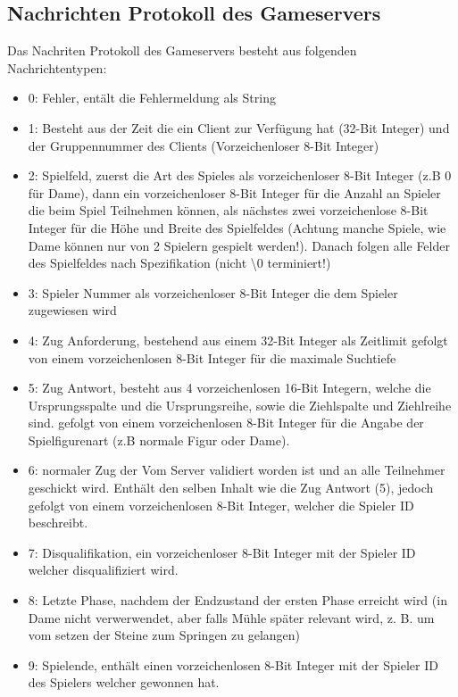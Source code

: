 \documentclass[12pt,a4paper,bibliography=totocnumbered,listof=totocnumbered]{article}
\begin{document}
\begin{appendix}
\pagebreak

\section{Nachrichten Protokoll des Gameservers}
\label{apx:Protokoll}
Das Nachriten Protokoll des Gameservers besteht aus folgenden Nachrichtentypen:
\begin{itemize}
    \item 0: Fehler, entält die Fehlermeldung als String
    \item 1: Besteht aus der Zeit die ein Client zur Verfügung hat (32-Bit Integer) und der Gruppennummer des Clients (Vorzeichenloser 8-Bit Integer)
    \item 2: Spielfeld, zuerst die Art des Spieles als vorzeichenloser 8-Bit Integer (z.B 0 für Dame), dann ein vorzeichenloser 8-Bit Integer für die Anzahl an Spieler die 
    beim Spiel Teilnehmen können, als nächstes zwei vorzeichenlose 8-Bit Integer für die Höhe und Breite des Spielfeldes 
    (Achtung manche Spiele, wie Dame können nur von 2 Spielern gespielt werden!).
    Danach folgen alle Felder des Spielfeldes nach Spezifikation (nicht \textbackslash0 terminiert!)
    \item 3: Spieler Nummer als vorzeichenloser 8-Bit Integer die dem Spieler zugewiesen wird
    \item 4: Zug Anforderung, bestehend aus einem 32-Bit Integer als Zeitlimit gefolgt von einem vorzeichenlosen 8-Bit Integer für die maximale Suchtiefe
    \item 5: Zug Antwort, besteht aus 4 vorzeichenlosen 16-Bit Integern, welche die Ursprungsspalte und die Ursprungsreihe, sowie die Ziehlspalte und Ziehlreihe sind.
    gefolgt von einem vorzeichenlosen 8-Bit Integer für die Angabe der Spielfigurenart (z.B normale Figur oder Dame).
    \item 6: normaler Zug der Vom Server validiert worden ist und an alle Teilnehmer geschickt wird. Enthält den selben Inhalt wie die Zug Antwort (5), jedoch 
    gefolgt von einem vorzeichenlosen 8-Bit Integer, welcher die Spieler ID beschreibt.
    \item 7: Disqualifikation, ein vorzeichenloser 8-Bit Integer mit der Spieler ID welcher disqualifiziert wird.
    \item 8: Letzte Phase, nachdem der Endzustand der ersten Phase erreicht wird (in Dame nicht verwerwendet, aber falls Mühle später relevant wird, z. B. um vom setzen 
    der Steine zum Springen zu gelangen)
    \item 9: Spielende, enthält einen vorzeichenlosen 8-Bit Integer mit der Spieler ID des Spielers welcher gewonnen hat.
\end{itemize}




\end{appendix}


\pagebreak
\end{document}
